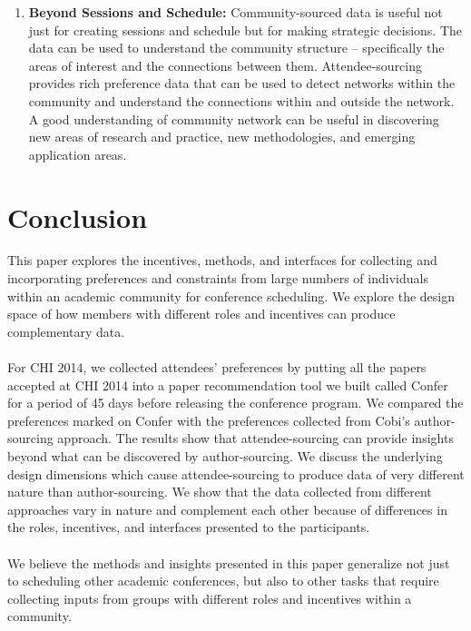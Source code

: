 \documentclass[letterpaper]{article}
\begin{document}
\begin{enumerate}
\item \textbf{Beyond Sessions and Schedule:} Community-sourced data is useful not just for creating sessions and schedule but for making strategic decisions. The data can be used to understand the community structure -- specifically the areas of interest and the connections between them. Attendee-sourcing provides rich preference data that can be used to detect networks within the community and understand the connections within and outside the network. A good understanding of community network can be useful in discovering new areas of research and practice, new methodologies, and emerging application areas.
\end{enumerate}
\section{Conclusion}
This paper explores the incentives, methods, and interfaces for collecting and incorporating preferences and constraints from large numbers of individuals within an academic community for conference scheduling. We explore the design space of how members with different roles and incentives can produce complementary data.
\\
\\
For CHI 2014, we collected attendees' preferences by putting all the papers accepted at CHI 2014 into a paper recommendation tool we built called Confer for a period of 45 days before releasing the conference program. We compared the preferences marked on Confer with the preferences collected from Cobi's author-sourcing approach. The results show that attendee-sourcing can provide insights beyond what can be discovered by author-sourcing. We discuss the underlying design dimensions which cause attendee-sourcing to produce data of very different nature than author-sourcing. We show that the data collected from different approaches vary in nature and complement each other because of differences in the roles, incentives, and interfaces presented to the participants.
\\
\\
We believe the methods and insights presented in this paper generalize not just to scheduling other academic conferences, but also to other tasks that require collecting inputs from groups with different roles and incentives within a community.


\end{document}
